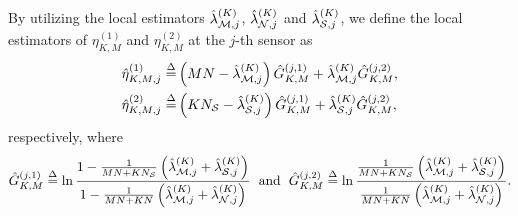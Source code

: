 \documentclass[11pt, draftclsnofoot, onecolumn]{IEEEtran}
\begin{document}
By utilizing the local estimators $\hat \lambda _{{\cal M},j}^{(K)}$, $\hat \lambda _{{\cal N},j}^{(K)}$ and $\hat \lambda _{{\cal S},j}^{(K)}$, we define the local estimators of ${\eta} _{K,M}^{(1)}$ and ${\eta}  _{K,M}^{(2)}$ at the $j$-th sensor as
\begin{align} \label{hat_eta_1_define}
\hat \eta _{K,M,j}^{(1)} \buildrel \Delta \over = & \left( {MN - \hat \lambda _{{\cal M},j}^{(K)}} \right)\hat G_{K,M}^{(j,1)} + \hat \lambda _{{\cal M},j}^{(K)}\hat G_{K,M}^{(j,2)}, \\ \label{hat_eta_2_define}
\hat \eta _{K,M,j}^{(2)} \buildrel \Delta \over = & \left( {K{N_{\cal S}} - \hat \lambda _{{\cal S},j}^{(K)}} \right)\hat G_{K,M}^{(j,1)} + \hat \lambda _{{\cal S},j}^{(K)}\hat G_{K,M}^{(j,2)},
\end{align}
respectively, where
\begin{equation} \label{hat_G}
\hat G_{K,M}^{(j,1)} \buildrel \Delta \over = \ln \frac{{1 - \frac{1}{{MN + K{N_{\cal S}}}}\left( {\hat \lambda _{{\cal M},j}^{(K)} + \hat \lambda _{{\cal S},j}^{(K)}} \right)}}{{1 - \frac{1}{{MN + KN}}\left( {\hat \lambda _{{\cal M},j}^{(K)} + \hat \lambda _{{\cal N},j}^{(K)}} \right)}} \; \text{ and } \; \hat G_{K,M}^{(j,2)} \buildrel \Delta \over = \ln \frac{{\frac{1}{{MN + K{N_{\cal S}}}}\left( {\hat \lambda _{{\cal M},j}^{(K)} + \hat \lambda _{{\cal S},j}^{(K)}} \right)}}{{\frac{1}{{MN + KN}}\left( {\hat \lambda _{{\cal M},j}^{(K)} + \hat \lambda _{{\cal N},j}^{(K)}} \right)}}.
\end{equation}
\end{document}
